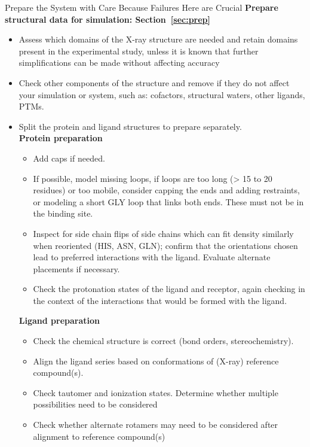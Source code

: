 \documentclass[9pt,bestpractices]{livecoms}
\begin{document}
\begin{Checklists*}

\begin{checklist}{Prepare the System with Care Because Failures Here are Crucial}
\textbf{Prepare structural data for simulation: Section~\ref{sec:prep}}
    \begin{itemize}
        \item Assess which domains of the X-ray structure are needed and retain domains present in the experimental study, unless it is known that further simplifications can be made without affecting accuracy
        \item Check other components of the structure and remove if they do not affect your simulation or system, such as: cofactors, structural waters, other ligands, PTMs.
        \item Split the protein and ligand structures to prepare separately.\\
        \textbf{Protein preparation}
    \begin{itemize}
                \item Add caps if needed.
                \item If possible, model missing loops, if loops are too long (> 15 to 20 residues) or too mobile, consider capping the ends and adding restraints, or modeling a short GLY loop that links both ends. These must not be in the binding site.
                \item Inspect for  side chain flips of side chains which can fit density similarly when reoriented (HIS, ASN, GLN); confirm that the orientations chosen lead to preferred interactions with the ligand. Evaluate alternate placements if necessary.
                \item Check the protonation states of the ligand and receptor, again checking in the context of the interactions that would be formed with the ligand.
    \end{itemize}
        \textbf{Ligand preparation}
    \begin{itemize}
            \item Check the chemical structure is correct (bond orders, stereochemistry).
            \item Align the ligand series based on conformations of (X-ray) reference compound(s).
            \item Check tautomer and ionization states. Determine whether multiple possibilities need to be considered
            \item Check whether alternate rotamers may need to be considered after alignment to reference compound(s)

\end{itemize}
\end{itemize}
\end{checklist}
\end{Checklists*}
\end{document}
